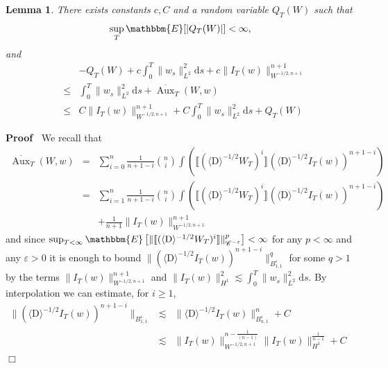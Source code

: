 \documentclass[11pt]{article}
\newcommand{\mathD}{\mathrm{D}}
\newcommand{\mathd}{\mathrm{d}}
\newcommand{\tmop}[1]{\ensuremath{\operatorname{#1}}}
\newenvironment{proof}{\noindent\textbf{Proof\ }}{\hspace*{\fill}$\Box$\medskip}
\newtheorem{lemma}{Lemma}
\newcommand{\VV}{\mathscr{C}}
\begin{document}
\begin{lemma}
  \label{lemma:bounds2}There exists constants $c, C$ and a random variable
  $Q_T (W)$ such that
  \[ \sup_T \mathbbm{E} [| Q_T (W) |] < \infty, \]
  and
  \begin{eqnarray*}
    &  & - Q_T (W) + c \int^T_0 \| w_s \|_{L^2}^2 \mathd s + c \| I_T (w)
    \|^{n + 1}_{W^{- 1 / 2, n + 1}}\\
    & \leqslant & \int^T_0 \| w_s \|_{L^2}^2 \mathd s +
    \overline{\tmop{Aux}}_T (W, w)\\
    & \leqslant & C \| I_T (w) \|^{n + 1}_{W^{- 1 / 2, n + 1}} + C \int^T_0
    \| w_s \|_{L^2}^2 \mathd s + Q_T (W)
  \end{eqnarray*}
  
\end{lemma}

\begin{proof}
  We recall that
  \begin{eqnarray*}
    \overline{\tmop{Aux}}_T (W, w) & = & \sum_{i = 0}^n \frac{1}{n + 1 - i}
    \binom{n}{i} \int (\llbracket (\langle \mathD \rangle^{- 1 / 2} W_T)^i
    \rrbracket^{} (\langle \mathD \rangle^{- 1 / 2} I_T (w))^{n + 1 - i}_{})\\
    & = & \sum_{i = 1}^n \frac{1}{n + 1 - i} \binom{n}{i} \int (\llbracket
    (\langle \mathD \rangle^{- 1 / 2} W_T)^i \rrbracket^{} (\langle \mathD
    \rangle^{- 1 / 2} I_T (w))^{n + 1 - i}_{})\\
    &  & + \frac{1}{n + 1} \| I_T (w) \|^{n + 1}_{W^{- 1 / 2, n + 1}}
  \end{eqnarray*}
  and since $\sup_{T < \infty} \mathbbm{E} \left[ \| \llbracket (\langle
  \mathD \rangle^{- 1 / 2} W_T)^i \rrbracket \|^p_{\VV^{- \varepsilon}}
  \right] < \infty$ for any $p < \infty$ and any $\varepsilon > 0$ it is
  enough to bound $\| (\langle \mathD \rangle^{- 1 / 2} I_T (w))^{n + 1 -
  i}_{} \|^q_{B_{1, 1}^{\varepsilon}}$ for some $q > 1$ by the terms $\| I_T
  (w) \|^{n + 1}_{W^{- 1 / 2, n + 1}}$ and $\| I_T (w) \|^2_{H^1} \lesssim
  \int^T_0 \| w_s \|_{L^2}^2 \mathd s$. By interpolation we can estimate, for
  $i \geqslant 1$,
  \[ \begin{array}{lll}
       \| (\langle \mathD \rangle^{- 1 / 2} I_T (w))^{n + 1 - i}_{} \|_{B_{1,
       1}^{\varepsilon}} & \lesssim & \| \langle \mathD \rangle^{- 1 / 2} I_T
       (w) \|^n_{B^{\varepsilon}_{n, 1}} + C\\
       \qquad & \lesssim & \| I_T (w) \|_{W^{- 1 / 2, n + 1}}^{n - \frac{1}{(n
       - 1)}} \| I_T (w) \|^{\frac{1}{n - 1}}_{H^1} + C \qquad \qquad

\end{array}\]
\end{proof}
\end{document}
